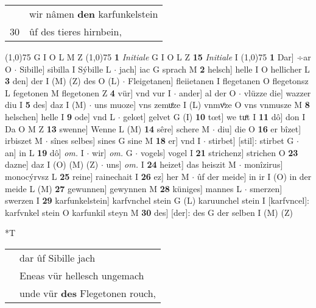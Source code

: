 \documentclass[8pt,a4paper,notitlepage]{article}
\begin{document}
\begin{table}[ht]
\begin{minipage}[t]{0.5\linewidth}
\begin{tabular}{rl}
 & wir nâmen \textbf{den} karfunkelstein\\ 
30 & ûf des tieres hirnbein,\\ 
\end{tabular}
\scriptsize
\line(1,0){75} \newline
G I O L M Z \newline
\line(1,0){75} \newline
\textbf{1} \textit{Initiale} G I O L Z  \textbf{15} \textit{Initiale} I  \newline
\line(1,0){75} \newline
\textbf{1} Dar] ÷ar O  $\cdot$ Sibille] sibilla I Sýbille L  $\cdot$ jach] iac G sprach M \textbf{2} helsch] helle I O hellicher L \textbf{3} den] der I (M) (Z) des O (L)  $\cdot$ Fleigetanen] fleiietanen I flegetanen O flegetonsz L fegetonen M flegetonen Z \textbf{4} vür] vnd vur I  $\cdot$ ander] al der O  $\cdot$ vlüzze die] wazzer diu I \textbf{5} des] daz I (M)  $\cdot$ uns muoze] vns zemuͤze I (L) vnmvͦze O vns vnmusze M \textbf{8} helschen] helle I \textbf{9} ode] vnd L  $\cdot$ gelœt] gelvet G (I) \textbf{10} tœt] we tuͤt I \textbf{11} dô] don I Da O M Z \textbf{13} swenne] Wenne L (M) \textbf{14} sêre] schere M  $\cdot$ diu] die O \textbf{16} er bîzet] irbiszet M  $\cdot$ sînes selbes] sines G sine M \textbf{18} er] vnd I  $\cdot$ stirbet] [stil]: stirbet G  $\cdot$ an] in L \textbf{19} dô] \textit{om.} I  $\cdot$ wir] \textit{om.} G  $\cdot$ vogels] vogel I \textbf{21} strichenz] strichen O \textbf{23} dazne] daz I (O) (M) (Z)  $\cdot$ uns] \textit{om.} I \textbf{24} heizet] das heiszit M  $\cdot$ monîzirus] monocýrvsz L \textbf{25} reine] rainechait I \textbf{26} ez] her M  $\cdot$ ûf der meide] in ir I (O) in der meide L (M) \textbf{27} gewunnen] gewynnen M \textbf{28} küniges] mannes L  $\cdot$ smerzen] swerzen I \textbf{29} karfunkelstein] karfvnchel stein G (L) karuunchel stein I [karfvncel]: karfvnkel stein O karfunkil steyn M \textbf{30} des] [der]: des G der selben I (M) (Z) \newline
\end{minipage}
\hspace{0.5cm}
\begin{minipage}[t]{0.5\linewidth}
\small
\begin{center}*T
\end{center}
\begin{tabular}{rl}
 & dar ûf Sibille jach\\ 
 & Eneas vür hellesch ungemach\\ 
 & unde vür \textbf{des} Flegetonen rouch,\\ 

\end{tabular}
\end{minipage}
\end{table}
\end{document}
